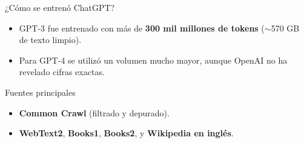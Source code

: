 \begin{frame}[t]{¿Cómo se entrenó ChatGPT?}
\begin{itemize}
    \item GPT-3 fue entrenado con más de \textbf{300 mil millones de tokens} ($\sim $570 GB de texto limpio).
    \item Para GPT-4 se utilizó un volumen mucho mayor, aunque OpenAI no ha revelado cifras exactas.
\end{itemize}

\vspace{0.3cm}
\begin{block}{Fuentes principales}
\begin{itemize}
    \item \textbf{Common Crawl} (filtrado y depurado).
    \item \textbf{WebText2}, \textbf{Books1}, \textbf{Books2}, y \textbf{Wikipedia en inglés}.
\end{itemize}
\end{block}
\end{frame}